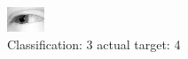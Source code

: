 \begin{figure}[h!]
\begin{center}
\includegraphics[width=0.60\columnwidth]{figures/ID2498_class_3_target_4.png}
\end{center}
\caption{ Classification: 3 actual target: 4}
\label{fig:ID2498_class_3_target_4}
\end{figure}

